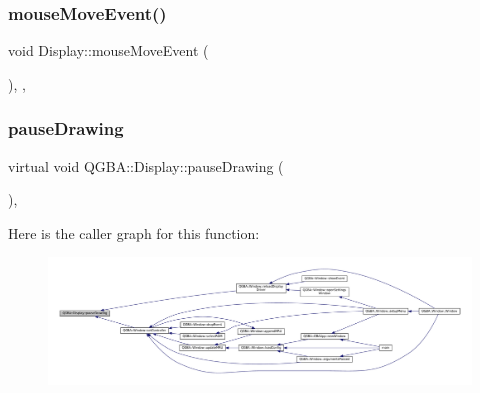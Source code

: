 \subsubsection{\texorpdfstring{mouse\+Move\+Event()}{mouseMoveEvent()}}
{\footnotesize\ttfamily void Display\+::mouse\+Move\+Event (\begin{DoxyParamCaption}\item[{Q\+Mouse\+Event $\ast$}]{ }\end{DoxyParamCaption})\hspace{0.3cm}{\ttfamily [override]}, {\ttfamily [protected]}, {\ttfamily [virtual]}}

\mbox{\label{class_q_g_b_a_1_1_display_a448aca153530cd1dc530ae524dac2903}} 
\subsubsection{\texorpdfstring{pause\+Drawing}{pauseDrawing}}
{\footnotesize\ttfamily virtual void Q\+G\+B\+A\+::\+Display\+::pause\+Drawing (\begin{DoxyParamCaption}{ }\end{DoxyParamCaption})\hspace{0.3cm}{\ttfamily [pure virtual]}, {\ttfamily [slot]}}

Here is the caller graph for this function\+:
\nopagebreak
\begin{figure}[H]
\begin{center}
\leavevmode
\includegraphics[width=350pt]{class_q_g_b_a_1_1_display_a448aca153530cd1dc530ae524dac2903_icgraph}
\end{center}
\end{figure}
\mbox{\label{class_q_g_b_a_1_1_display_a4fef4c98d3800f017b7df2135a6cd9d1}} 
